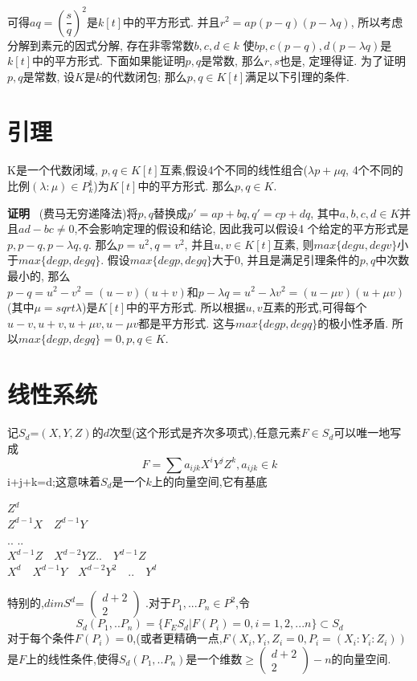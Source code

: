 \documentclass[UTF8]{book}
\begin{document}
		
		可得$aq=(\dfrac{s}{q})^{2}$是$ k[t] $中的平方形式. 并且$r^{2}=ap(p-q)(p-\lambda q)$, 所以考虑分解到素元的因式分解, 存在非零常数$b,c,d\in k $ 使$bp,c(p-q),d(p-\lambda q)$是$ k[t] $中的平方形式. 下面如果能证明$ p, q $是常数, 那么$ r, s $也是, 定理得证. 为了证明$ p, q $是常数, 设$ K $是$ k $的代数闭包; 那么$p,q\in K[t]$满足以下引理的条件.

	\section{引理}
		K是一个代数闭域, $p,q\in K[t]$互素,假设4个不同的线性组合($\lambda p+\mu q$, 4个不同的比例$(\lambda:\mu)\in P^{1}_{k}$)为$ K[t] $中的平方形式. 那么$p,q\in K$.
		
		
		\textbf{证明} \ (费马无穷递降法)将$ p,q $替换成$ p'=ap+bq,q'=cp+dq $, 其中$a,b,c,d\in K$并且$ad-bc\neq 0$,不会影响定理的假设和结论, 因此我可以假设4 个给定的平方形式是$p,p-q,p-\lambda q,q$. 那么$p=u^{2},q=v^{2}$, 并且$u,v\in K[t]$互素, 则$max\{deg u,deg v\}$小于$max\{deg p,deg q\}$. 假设$max\{deg p,deg q\}$大于0, 并且是满足引理条件的$ p,q $中次数最小的, 那么$p-q=u^{2}-v^{2}=(u-v)(u+v)和p-\lambda q=u^{2}-\lambda v^{2}=(u-\mu v)(u+\mu v)$(其中$\mu=sqrt{\lambda}$)是$ K[t] $中的平方形式. 所以根据$ u,v $互素的形式,可得每个$u-v,u+v,u+\mu v,u-\mu v$都是平方形式. 这与$ max\{deg p,deg q\} $的极小性矛盾. 所以$max\{deg p,deg q\}=0, p,q\in K.$
	\section{线性系统}
		记$S_{d}$={$ (X,Y,Z) $的$ d $次型}(这个形式是齐次多项式),任意元素$F \in S_{d}$可以唯一地写成
		\begin{equation*}
		F=\sum a_{ijk} X^{i}Y^{j}Z^{k},a_{ijk} \in k
		\end{equation*}
		i+j+k=d;这意味着$S_{d}$是一个$ k $上的向量空间,它有基底
		\begin{center}
		$Z^{d}$\\
		$Z^{d-1}X  \quad Z^{d-1}Y$\\
		..            ..\\
		$X^{d-1}Z  \quad X^{d-2}YZ  ..  \quad Y^{d-1}Z$\\
		$X^{d}\quad X^{d-1}Y  \quad X^{d-2}Y^{2}\quad   ..  \quad Y^{d}$\\
		\end{center}
		特别的,$dimS^{d}$=
		$\begin{pmatrix}
		     d+2  \\
		      2
		\end{pmatrix}$
		.对于$P_{1},...P_{n} \in P^{2}$,令
		\begin{equation*}
		S_{d}(P_{1},..P_{n})=\{F_{E}S_{d}|F(P_{i})=0,i=1,2,...n\} \subset S_{d}
		\end{equation*}
		对于每个条件$ F(P_{i})=0 $,(或者更精确一点,$ F(X_{i},Y_{i},Z_{i}=0,P_{i}=(X_{i}:Y_{i}:Z_{i})) $
		是$ F $上的线性条件,使得$S_{d}(P_{1},..P_{n})$是一个维数$\geq\left(\begin{array}{c}{d+2} \\ {2}\end{array}\right)-n$的向量空间.
\end{document}
